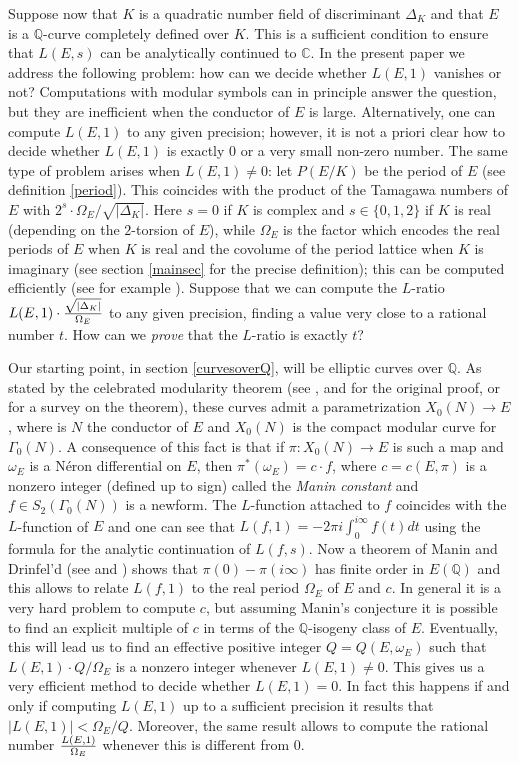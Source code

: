 \documentclass[11pt]{amsart}
\theoremstyle{definition}
\begin{document}
	Suppose now that $K$ is a quadratic number field of discriminant $\Delta_K$ and that $E$ is a ${\mathbb{Q}}$-curve completely defined over $K$. This is a sufficient condition to ensure that $L(E,s)$ can be analytically continued to ${\mathbb{C}}$. In the present paper we address the following problem: how can we decide whether $L(E,1)$ vanishes or not? Computations with modular symbols can in principle answer the question, but they are inefficient when the conductor of $E$ is large. Alternatively, one can compute $L(E,1)$ to any given precision; however, it is not a priori clear how to decide whether $L(E,1)$ is exactly $0$ or a very small non-zero number. The same type of problem arises when $L(E,1)\neq 0$: let $P(E/K)$ be the period of $E$ (see definition \ref{period}). This coincides with the product of the Tamagawa numbers of $E$ with $2^s\cdot\Omega_E/\sqrt{|\Delta_K|}$. Here $s=0$ if $K$ is complex and $s\in\{0,1,2\}$ if $K$ is real (depending on the $2$-torsion of $E$), while $\Omega_E$ is the factor which encodes the real periods of $E$ when $K$ is real and the covolume of the period lattice when $K$ is imaginary (see section \ref{mainsec} for the precise definition); this can be computed efficiently (see for example \cite{creto}). Suppose that we can compute the $L$-ratio ${\displaystyle} L(E,1)\cdot \frac{\sqrt{|\Delta_K|}}{\Omega_E}$ to any given precision, finding a value very close to a rational number $t$. How can we \emph{prove} that the $L$-ratio is exactly $t$?

	Our starting point, in section \ref{curvesoverQ}, will be elliptic curves over ${\mathbb{Q}}$. As stated by the celebrated modularity theorem (see \cite{wil}, \cite{tawil} and \cite{bcdt} for the original proof, or \cite{dis} for a survey on the theorem), these curves admit a parametrization $X_0(N)\to E$, where is $N$ the conductor of $E$ and $X_0(N)$ is the compact modular curve for $\Gamma_0(N)$. A consequence of this fact is that if $\pi\colon X_0(N)\to E$ is such a map and $\omega_E$ is a N\'{e}ron differential on $E$, then $\pi^*(\omega_E)=c\cdot f$, where $c=c(E,\pi)$ is a nonzero integer (defined up to sign) called the \emph{Manin constant} and $f\in S_2(\Gamma_0(N))$ is a newform. The $L$-function attached to $f$ coincides with the $L$-function of $E$ and one can see that $L(f,1)=-2\pi i\int_{0}^{i\infty}f(t)dt$ using the formula for the analytic continuation of $L(f,s)$. Now a theorem of Manin and Drinfel'd (see \cite{man1} and \cite{drin}) shows that $\pi(0)-\pi(i\infty)$ has finite order in $E({\mathbb{Q}})$ and this allows to relate $L(f,1)$ to the real period $\Omega_E$ of $E$ and $c$. In general it is a very hard problem to compute $c$, but assuming Manin's conjecture it is possible to find an explicit multiple of $c$ in terms of the ${\mathbb{Q}}$-isogeny class of $E$. Eventually, this will lead us to find an effective positive integer $Q=Q(E,\omega_E)$ such that $L(E,1)\cdot Q/\Omega_E$ is a nonzero integer whenever $L(E,1)\neq 0$. This gives us a very efficient method to decide whether $L(E,1)=0$. In fact this happens if and only if computing $L(E,1)$ up to a sufficient precision it results that $|L(E,1)|<\Omega_E/Q$. Moreover, the same result allows to compute the rational number ${\displaystyle} \frac{L(E,1)}{\Omega_E}$ whenever this is different from $0$.
\end{document}
